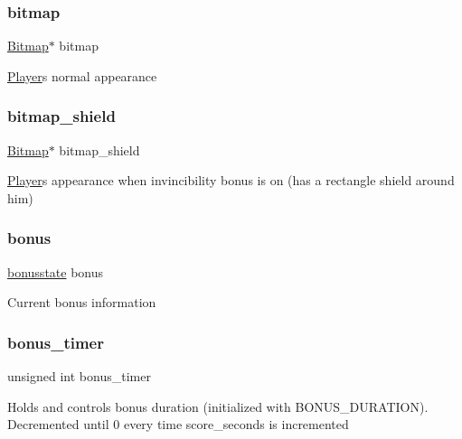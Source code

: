 \subsubsection{\texorpdfstring{bitmap}{bitmap}}
{\footnotesize\ttfamily \hyperlink{struct_bitmap}{Bitmap}$\ast$ bitmap}

\hyperlink{struct_player}{Player}\textquotesingle{}s normal appearance \hypertarget{struct_player_adb5f5a8861d7950622a415e122e4e6d7}{}\label{struct_player_adb5f5a8861d7950622a415e122e4e6d7} 
\subsubsection{\texorpdfstring{bitmap\+\_\+shield}{bitmap\_shield}}
{\footnotesize\ttfamily \hyperlink{struct_bitmap}{Bitmap}$\ast$ bitmap\+\_\+shield}

\hyperlink{struct_player}{Player}\textquotesingle{}s appearance when invincibility bonus is on (has a rectangle shield around him) \hypertarget{struct_player_ad071f1edf847f7378f6161c02ba70640}{}\label{struct_player_ad071f1edf847f7378f6161c02ba70640} 
\subsubsection{\texorpdfstring{bonus}{bonus}}
{\footnotesize\ttfamily \hyperlink{group__player_ga3ab4abfc8d967315be3486178b91d2d9}{bonusstate} bonus}

Current bonus information \hypertarget{struct_player_a0b2f5a7e6b082f9f828b559d165ac60f}{}\label{struct_player_a0b2f5a7e6b082f9f828b559d165ac60f} 
\subsubsection{\texorpdfstring{bonus\+\_\+timer}{bonus\_timer}}
{\footnotesize\ttfamily unsigned int bonus\+\_\+timer}

Holds and controls bonus duration (initialized with B\+O\+N\+U\+S\+\_\+\+D\+U\+R\+A\+T\+I\+ON). Decremented until 0 every time score\+\_\+seconds is incremented \hypertarget{struct_player_a391d726f640974bcd70eeba097a92ebf}{}\label{struct_player_a391d726f640974bcd70eeba097a92ebf} 
